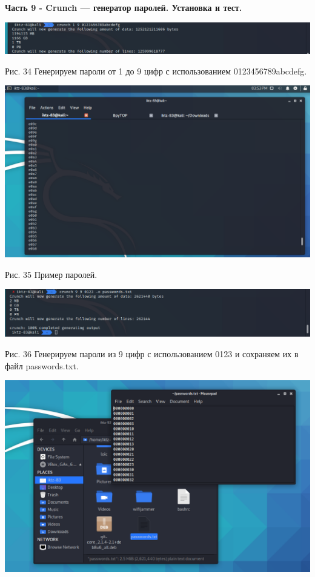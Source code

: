 \documentclass[a4paper,14pt]{extarticle}
\begin{document}
    \textbf{Часть 9 - Crunch — генератор паролей. Установка и тест.}
    \begin{center}

        \includegraphics[scale=0.4]{pics/34.png}

        Рис. 34 Генерируем пароли от 1 до 9 цифр с использованием 0123456789abcdefg.
        \vspace{1ex}

        \includegraphics[scale=0.4]{pics/35.png}

        Рис. 35 Пример паролей.
        \vspace{1ex}

        \includegraphics[scale=0.4]{pics/36.png}

        \begin{singlespace}
            Рис. 36 Генерируем пароли из 9 цифр с использованием 0123 и сохраняем их в файл passwords.txt.
        \vspace{1ex}
        \end{singlespace}

        \includegraphics[scale=0.33]{pics/37.png}


\end{center}
\end{document}
